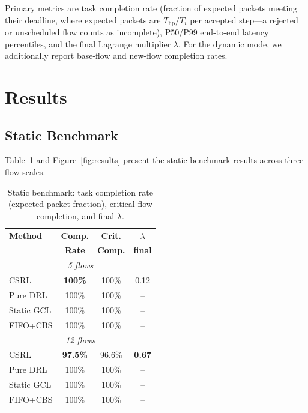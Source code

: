 \documentclass[conference]{IEEEtran}
\begin{document}
Primary metrics are task completion rate (fraction of expected packets meeting their deadline, where expected packets are $T_{\text{hp}}/T_i$ per accepted step---a rejected or unscheduled flow counts as incomplete), P50/P99 end-to-end latency percentiles, and the final Lagrange multiplier $\lambda$. For the dynamic mode, we additionally report base-flow and new-flow completion rates.

\section{Results}

\subsection{Static Benchmark}

Table~\ref{tab:static} and Figure~\ref{fig:results} present the static benchmark results across three flow scales.

\begin{table}[t]
\centering
\caption{Static benchmark: task completion rate (expected-packet fraction), critical-flow completion, and final $\lambda$.}
\label{tab:static}
\begin{tabular}{lccc}
\toprule
\textbf{Method} & \textbf{Comp.} & \textbf{Crit.} & $\lambda$ \\
                & \textbf{Rate} & \textbf{Comp.} & \textbf{final} \\
\midrule
\multicolumn{4}{c}{\textit{5 flows}} \\
\midrule
CSRL & \textbf{100\%} & 100\% & 0.12 \\
Pure DRL & 100\% & 100\% & -- \\
Static GCL & 100\% & 100\% & -- \\
FIFO+CBS & 100\% & 100\% & -- \\
\midrule
\multicolumn{4}{c}{\textit{12 flows}} \\
\midrule
CSRL & \textbf{97.5\%} & 96.6\% & \textbf{0.67} \\
Pure DRL & 100\% & 100\% & -- \\
Static GCL & 100\% & 100\% & -- \\
FIFO+CBS & 100\% & 100\% & -- \\
\bottomrule
\end{tabular}
\end{table}
\end{document}
